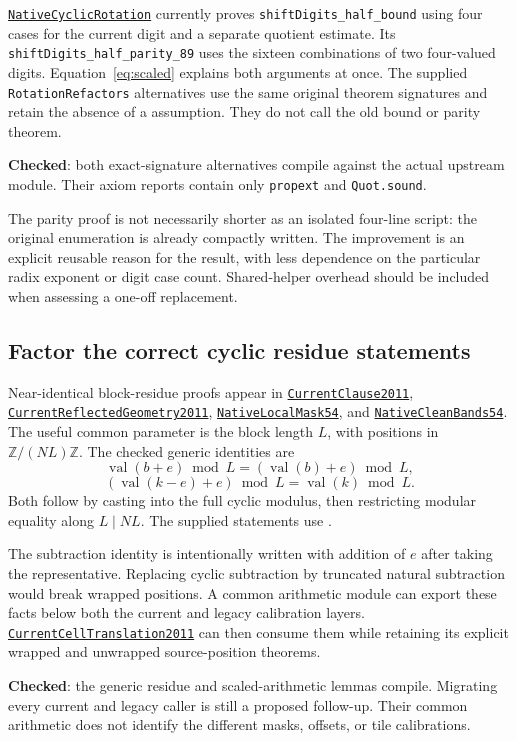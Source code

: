 \documentclass[11pt,letterpaper]{article}
\newcommand{\code}[1]{\nolinkurl{#1}}
\newcommand{\src}[1]{\href{https://github.com/VladimirReshetnikov/ProveIt/blob/60e9c5d620c6c387d932876cfa2d9376f64ea56c/Computability/DiophantineConsistency/Lean/DiophantineConsistency/#1.lean}{\texttt{#1}}}
\newcommand{\checked}{\textbf{Checked}}
\newcommand{\RotationStatus}{\checked: both exact-signature alternatives compile against the actual upstream module. Their axiom reports contain only \code{propext} and \code{Quot.sound}.}
\begin{document}
\src{NativeCyclicRotation} currently proves \code{shiftDigits_half_bound}
using four cases for the current digit and a separate quotient estimate.
Its \code{shiftDigits_half_parity_89} uses the sixteen combinations of two
four-valued digits. Equation~\eqref{eq:scaled} explains both arguments at once.
The supplied \code{RotationRefactors} alternatives use the same original theorem
signatures and retain the absence of a \texttt{} assumption. They do not
call the old bound or parity theorem.

\RotationStatus

The parity proof is not necessarily shorter as an isolated four-line script:
the original enumeration is already compactly written. The improvement is an
explicit reusable reason for the result, with less dependence on the particular
radix exponent or digit case count. Shared-helper overhead should be included
when assessing a one-off replacement.

\subsection{Factor the correct cyclic residue statements}

Near-identical block-residue proofs appear in \src{CurrentClause2011},
\src{CurrentReflectedGeometry2011}, \src{NativeLocalMask54}, and
\src{NativeCleanBands54}. The useful common parameter is the block length $L$,
with positions in $\mathbb Z/(NL)\mathbb Z$. The checked generic identities are
\[
 \operatorname{val}(b+e)\bmod L=(\operatorname{val}(b)+e)\bmod L,
\]
\[
 (\operatorname{val}(k-e)+e)\bmod L=\operatorname{val}(k)\bmod L.
\]
Both follow by casting into the full cyclic modulus, then restricting modular
equality along $L\mid NL$. The supplied statements use \texttt{\detokenize{[NeZero (N * L)]}}.

The subtraction identity is intentionally written with addition of $e$ after
taking the representative. Replacing cyclic subtraction by truncated natural
subtraction would break wrapped positions. A common arithmetic module can
export these facts below both the current and legacy calibration layers.
\src{CurrentCellTranslation2011} can then consume them while retaining its
explicit wrapped and unwrapped source-position theorems.

\checked: the generic residue and scaled-arithmetic lemmas compile. Migrating
every current and legacy caller is still a proposed follow-up. Their common
arithmetic does not identify the different masks, offsets, or tile calibrations.
\end{document}
